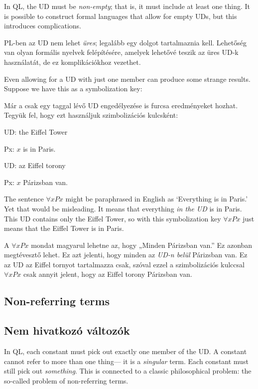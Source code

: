

In QL, the UD must be \emph{non-empty}; that is, it must include at least one thing. It is possible to construct formal languages that allow for empty UDs, but this introduces complications.

PL-ben az UD  nem lehet \emph{üres}; legalább egy dolgot tartalmaznia kell. Lehetőség van olyan formális nyelvek felépítésére, amelyek lehetővé teszik az üres UD-k használatát, de ez komplikációkhoz vezethet.

Even allowing for a UD with just one member can produce some strange results. Suppose we have this as a symbolization key:

Már a csak egy taggal lévő UD engedélyezése is furcsa eredményeket hozhat. Tegyük fel, hogy ezt használjuk szimbolizációs kulcsként:
\begin{ekey}
\item[UD:] the Eiffel Tower
\item[Px:] $x$ is in Paris.
\end{ekey}

\begin{ekey}
\item[UD:] az Eiffel torony
\item[Px:] $x$ Párizsban van.
\end{ekey}
The sentence $\forall x Px$ might be paraphrased in English as `Everything is in Paris.' Yet that would be misleading. It means that everything \emph{in the UD} is in Paris. This UD contains only the Eiffel Tower, so with this symbolization key $\forall x Px$ just means that the Eiffel Tower is in Paris.

A $\forall x Px$ mondat magyarul lehetne az, hogy „Minden Párizsban van.” Ez azonban megtévesztő lehet. Ez azt jelenti, hogy minden az \emph{UD-n belül} Párizsban van. Ez az UD az Eiffel tornyot tartalmazza csak, szóval ezzel a szimbolizációs kulccsal $\forall x Px$ csak annyit jelent, hogy az Eiffel torony Párizsban van.

\subsection*{Non-referring terms}
\subsection{Nem hivatkozó változók}
In QL, each constant must pick out exactly one member of the UD. A constant cannot refer to more than one thing--- it is a \emph{singular} term. Each constant must still pick out \emph{something}. This is connected to a classic philosophical problem: the so-called problem of non-referring terms.

